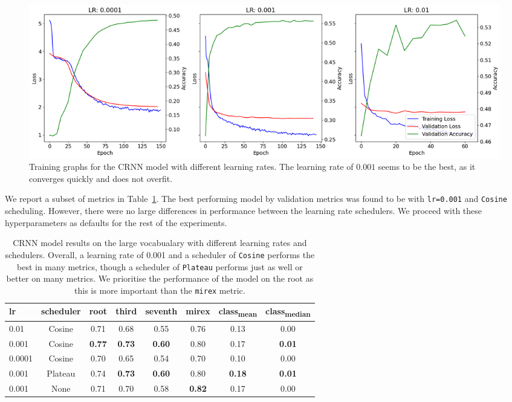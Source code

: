 \begin{figure}[h]
    \centering
    \includegraphics[width=1.0\textwidth]{figures/lr_search_cosine.png}
    \caption{Training graphs for the CRNN model with different learning rates. The learning rate of $0.001$ seems to be the best, as it converges quickly and does not overfit.}\label{fig:lr_search_cosine}
\end{figure}

We report a subset of metrics in Table~\ref{tab:crnn_lr}. The best performing model by validation metrics was found to be with \texttt{lr=0.001} and \texttt{Cosine} scheduling. However, there were no large differences in performance between the learning rate schedulers. We proceed with these hyperparameters as defaults for the rest of the experiments.

\begin{table}[h]
    \centering
    \begin{tabular}{lccccccc}
        \toprule
        lr & scheduler & root & third & seventh & mirex & class\textsubscript{mean} & class\textsubscript{median} \\
        \midrule
        0.01 & Cosine & 0.71 & 0.68 & 0.55 & 0.76 & 0.13 & 0.00 \\
        0.001 & Cosine & \textbf{0.77} & \textbf{0.73} & \textbf{0.60} & 0.80 & 0.17 & \textbf{0.01} \\
        0.0001 & Cosine & 0.70 & 0.65 & 0.54 & 0.70 & 0.10 & 0.00 \\
        \midrule
        0.001 & Plateau & 0.74 & \textbf{0.73} & \textbf{0.60} & 0.80 & \textbf{0.18} & \textbf{0.01} \\
        0.001 & None & 0.71 & 0.70 & 0.58 & \textbf{0.82} & 0.17 & 0.00 \\
        \bottomrule
    \end{tabular}
    \caption{CRNN model results on the large vocabualary with different learning rates and schedulers. Overall, a learning rate of 0.001 and a scheduler of \texttt{Cosine} performs the best in many metrics, though a scheduler of \texttt{Plateau} performs just as well or better on many metrics. We prioritise the performance of the model on the root as this is more important than the \texttt{mirex} metric. }\label{tab:crnn_lr}
\end{table}

